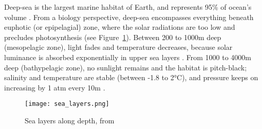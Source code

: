 




Deep-sea is the largest marine habitat of Earth, and represents 95\% of ocean's volume \citep{danovaro2017,salazar2016}. From a biology perspective, deep-sea encompasses everything beneath euphotic (or epipelagial) zone, where the solar radiations are too low and precludes photosynthesis \citep{baker2020,danovaro2017,salazar2016} (see Figure~\ref{fig:dsl}). Between 200 to 1000m deep (mesopelagic zone), light fades and temperature decreases, because solar luminance is absorbed exponentially in upper sea layers \citep{reynolds2001}. From 1000 to 4000m deep (bathypelagic zone), no sunlight remains and the habitat is pitch-black; salinity and temperature are stable (between -1.8 to 2°C), and pressure keeps on increasing by 1 atm every 10m \citep{danovaro2017}. 

\begin{figure} [!htbp]
	\begin{center}
		\texttt{[image: sea\_layers.png]}
	\end{center}
	\caption[Petite légende]{Sea layers along depth, from \citep{fig_deep_sea}}
	\label{fig:dsl}
\end{figure}

